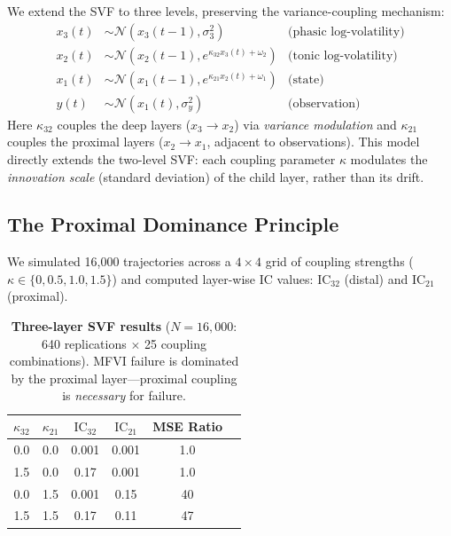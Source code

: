 \documentclass[10pt]{article} %
\theoremstyle{plain}
\theoremstyle{definition}
\newcommand{\IC}{\mathrm{IC}}  %
\begin{document}
We extend the SVF to three levels, preserving the variance-coupling mechanism:
\begin{align}
x_3(t) &\sim \mathcal{N}(x_3(t-1), \sigma_3^2) & \text{(phasic log-volatility)} \\
x_2(t) &\sim \mathcal{N}(x_2(t-1), e^{\kappa_{32} x_3(t) + \omega_2}) & \text{(tonic log-volatility)} \\
x_1(t) &\sim \mathcal{N}(x_1(t-1), e^{\kappa_{21} x_2(t) + \omega_1}) & \text{(state)} \\
y(t) &\sim \mathcal{N}(x_1(t), \sigma_y^2) & \text{(observation)}
\end{align}
Here $\kappa_{32}$ couples the deep layers ($x_3 \to x_2$) via \emph{variance modulation} and $\kappa_{21}$ couples the proximal layers ($x_2 \to x_1$, adjacent to observations). This model directly extends the two-level SVF: each coupling parameter $\kappa$ modulates the \emph{innovation scale} (standard deviation) of the child layer, rather than its drift.

\subsection{The Proximal Dominance Principle}

We simulated 16,000 trajectories across a $4 \times 4$ grid of coupling strengths ($\kappa \in \{0, 0.5, 1.0, 1.5\}$) and computed layer-wise IC values: $\IC_{32}$ (distal) and $\IC_{21}$ (proximal).

\begin{table}[!htbp]
\centering
\caption{\textbf{Three-layer SVF results} ($N = 16{,}000$: 640 replications $\times$ 25 coupling combinations). MFVI failure is dominated by the proximal layer---proximal coupling is \emph{necessary} for failure.}
\label{tab:3layer}
\begin{tabular}{@{}cccccc@{}}
\toprule
$\kappa_{32}$ & $\kappa_{21}$ & $\IC_{32}$ & $\IC_{21}$ & MSE Ratio \\
\midrule
0.0 & 0.0 & 0.001 & 0.001 & 1.0 \\
1.5 & 0.0 & 0.17 & 0.001 & 1.0 \\
0.0 & 1.5 & 0.001 & 0.15 & 40 \\
1.5 & 1.5 & 0.17 & 0.11 & 47 \\
\bottomrule
\end{tabular}
\end{table}
\end{document}
